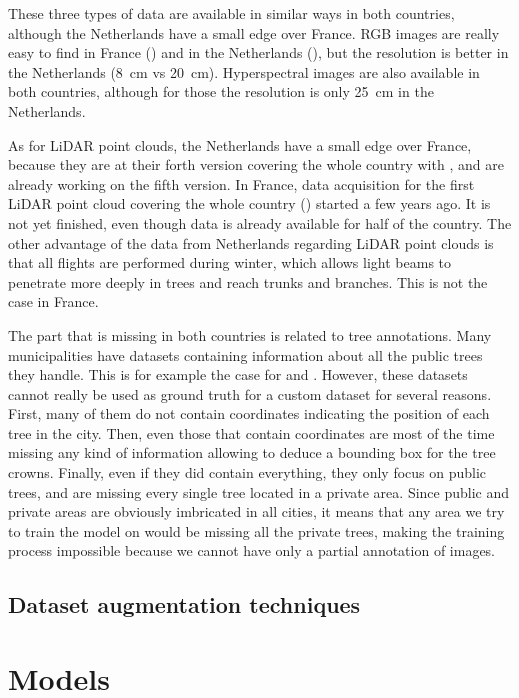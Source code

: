 \documentclass[
]{report}
\begin{document}
These three types of data are available in similar ways in both
countries, although the Netherlands have a small edge over France. RGB
images are really easy to find in France (\textcite{IGN_BDORTHO}) and in
the Netherlands (\textcite{Luchtfotos}), but the resolution is better in
the Netherlands (8~cm vs 20~cm). Hyperspectral images are also available
in both countries, although for those the resolution is only 25~cm in
the Netherlands.

As for LiDAR point clouds, the Netherlands have a small edge over
France, because they are at their forth version covering the whole
country with \textcite{AHN4}, and are already working on the fifth
version. In France, data acquisition for the first LiDAR point cloud
covering the whole country (\textcite{IGN_LiDARHD}) started a few years
ago. It is not yet finished, even though data is already available for
half of the country. The other advantage of the data from Netherlands
regarding LiDAR point clouds is that all flights are performed during
winter, which allows light beams to penetrate more deeply in trees and
reach trunks and branches. This is not the case in France.

The part that is missing in both countries is related to tree
annotations. Many municipalities have datasets containing information
about all the public trees they handle. This is for example the case for
\textcite{amsterdam_trees} and \textcite{bordeaux_trees}. However, these
datasets cannot really be used as ground truth for a custom dataset for
several reasons. First, many of them do not contain coordinates
indicating the position of each tree in the city. Then, even those that
contain coordinates are most of the time missing any kind of information
allowing to deduce a bounding box for the tree crowns. Finally, even if
they did contain everything, they only focus on public trees, and are
missing every single tree located in a private area. Since public and
private areas are obviously imbricated in all cities, it means that any
area we try to train the model on would be missing all the private
trees, making the training process impossible because we cannot have
only a partial annotation of images.

\subsection{Dataset augmentation
techniques}\label{dataset-augmentation-techniques}

\section{Models}\label{models}
\end{document}

